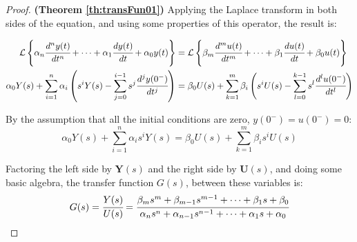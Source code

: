 \documentclass[a4paper,11pt]{book}
\numberwithin{figure}{chapter}
\numberwithin{equation}{chapter}
\numberwithin{table}{chapter}
\theoremstyle{definition}
\begin{document}
\begin{proof}{\textbf{(Theorem \ref{th:transFun01})}}
	Applying the Laplace transform in both sides of the equation, and using some properties of this operator, the result is:

	\begin{equation} 
	\begin{split}
	    \mathcal{L} \left\{\alpha_n \cfrac{d^n y(t)}{dt^n} + \cdots + \alpha_{1} \cfrac{d y(t)}{dt} + \alpha_{0} y(t) \right\}  &= \mathcal{L} \left\{ \beta_m \cfrac{d^m u(t)}{dt^m} + \cdots + \beta_{1} \cfrac{d u(t)}{dt} + \beta_{0} u(t) \right \}  \\
	    \alpha_0 Y(s) + \sum_{i=1}^{n} \alpha_i \left(s^i Y(s) - \sum^{i-1}_{j = 0} s^j \cfrac{d^j y(0^-)}{dt^j} \right) &= \beta_0 U(s) + \sum_{k=1}^{m} \beta_i \left(s^i U(s) - \sum^{k-1}_{l = 0} s^l \cfrac{d^l u(0^-)}{dt^l} \right)
	\end{split}
	\end{equation}
	
	By the assumption that all the initial conditions are zero, $y(0^-) = u(0^-) = 0$: 
	\begin{equation} 
	    \alpha_0 Y(s) + \sum_{i=1}^{n} \alpha_i s^i Y(s) = \beta_0 U(s) + \sum_{k=1}^{m} \beta_i s^i U(s)
	\end{equation}
	
	Factoring the left side by $\bm{Y}(s)$ and the right side by $\bm{U}(s)$, and doing some basic algebra, the transfer function $G(s)$, between these variables is:
	\begin{equation} 
	 G(s) = \cfrac{Y(s)}{U(s)} = \cfrac{\beta_m s^m + \beta_{m-1} s^{m-1} + \cdots + \beta_{1} s + \beta_0}{\alpha_n s^n + \alpha_{n-1} s^{n-1} + \cdots + \alpha_{1} s + \alpha_0}
	\end{equation}
\end{proof}

\end{document}
